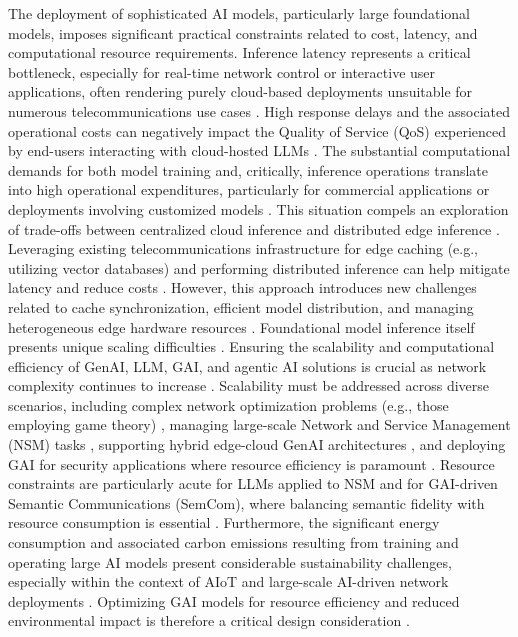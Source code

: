 \documentclass[sigconf]{acmart}
\begin{document}
The deployment of sophisticated AI models, particularly large foundational models, imposes significant practical constraints related to cost, latency, and computational resource requirements. Inference latency represents a critical bottleneck, especially for real-time network control or interactive user applications, often rendering purely cloud-based deployments unsuitable for numerous telecommunications use cases \cite{ref3, ref31}. High response delays and the associated operational costs can negatively impact the Quality of Service (QoS) experienced by end-users interacting with cloud-hosted LLMs \cite{ref14}. The substantial computational demands for both model training and, critically, inference operations translate into high operational expenditures, particularly for commercial applications or deployments involving customized models \cite{ref3, ref8, ref31}. This situation compels an exploration of trade-offs between centralized cloud inference and distributed edge inference \cite{ref3, ref31}. Leveraging existing telecommunications infrastructure for edge caching (e.g., utilizing vector databases) and performing distributed inference can help mitigate latency and reduce costs \cite{ref3, ref14, ref31}. However, this approach introduces new challenges related to cache synchronization, efficient model distribution, and managing heterogeneous edge hardware resources \cite{ref3}. Foundational model inference itself presents unique scaling difficulties \cite{ref3}. Ensuring the scalability and computational efficiency of GenAI, LLM, GAI, and agentic AI solutions is crucial as network complexity continues to increase \cite{ref6, ref9, ref20, ref25, ref31, ref35}. Scalability must be addressed across diverse scenarios, including complex network optimization problems (e.g., those employing game theory) \cite{ref21, ref25}, managing large-scale Network and Service Management (NSM) tasks \cite{ref25}, supporting hybrid edge-cloud GenAI architectures \cite{ref31}, and deploying GAI for security applications where resource efficiency is paramount \cite{ref5}. Resource constraints are particularly acute for LLMs applied to NSM \cite{ref25} and for GAI-driven Semantic Communications (SemCom), where balancing semantic fidelity with resource consumption is essential \cite{ref22, ref23, ref24}. Furthermore, the significant energy consumption and associated carbon emissions resulting from training and operating large AI models present considerable sustainability challenges, especially within the context of AIoT and large-scale AI-driven network deployments \cite{ref29, ref31, ref34, ref35}. Optimizing GAI models for resource efficiency and reduced environmental impact is therefore a critical design consideration \cite{ref5, ref25, ref29}.
\end{document}
